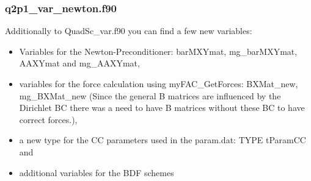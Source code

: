 \subsubsection*{q2p1\_var\_newton.f90} 
Additionally to QuadSc\_var.f90 you can find a few new variables:
\begin{itemize}
\item Variables for the Newton-Preconditioner: barMXYmat, mg\_barMXYmat, AAXYmat and mg\_AAXYmat,
\item variables for the force calculation using myFAC\_GetForces: BXMat\_new, mg\_BXMat\_new (Since the general B matrices are influenced by the Dirichlet BC there was a need to have B matrices without these BC to have correct forces.),
\item a new type for the CC parameters used in the param.dat: TYPE tParamCC and
\item additional variables for the BDF schemes
\end{itemize}



